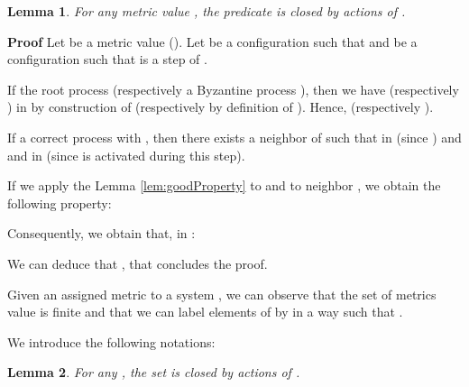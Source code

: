 \documentclass[11pt]{article}
\newenvironment{proof}{\noindent\textbf{Proof}}{\hfill\qed}
\newcommand{\qed}{\hfill}
\newtheorem{lem}{Lemma}
\newenvironment{lemma}[1]{\vspace{-0.25cm}\begin{lem}#1}{\end{lem}\vspace{-0.3cm}}
\begin{document}
\begin{lemma}\label{lem:Imclosed}
For any metric value , the predicate  is closed by actions of .
\end{lemma}

\begin{proof}
Let  be a metric value (). Let  be a configuration such that  and  be a configuration such that  is a step of .

If the root process  (respectively a Byzantine process ), then we have  (respectively ) in  by construction of  (respectively by definition of ). Hence,  (respectively ).

If a correct process  with , then there exists a neighbor  of  such that  in  (since ) and  and   in  (since  is activated during this step).

If we apply the Lemma \ref{lem:goodProperty} to  and to neighbor , we obtain the following property:
  

Consequently, we obtain that, in :


We can deduce that , that concludes the proof.
\end{proof}

Given an assigned metric to a system , we can observe that the set of metrics value  is finite and that we can label elements of  by  in a way such that .

We introduce the following notations:


\begin{lemma}\label{lem:LCmiclosed}
For any , the set  is closed by actions of .
\end{lemma}
\end{document}
